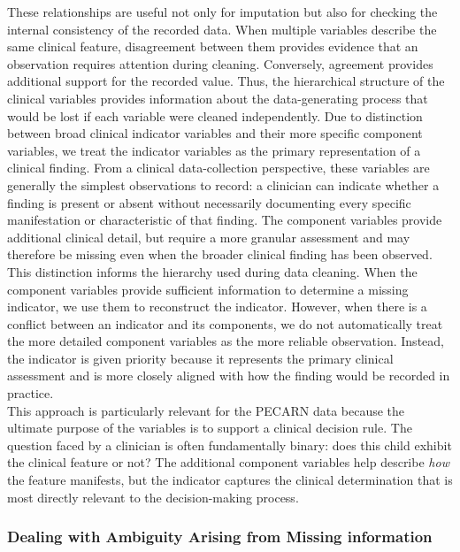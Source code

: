 \documentclass[10pt,letterpaper]{article}
\begin{document}
These relationships are useful not only for imputation but also for checking the internal consistency of the recorded data. When multiple variables describe the same clinical feature, disagreement between them provides evidence that an observation requires attention during cleaning. Conversely, agreement provides additional support for the recorded value. Thus, the hierarchical structure of the clinical variables provides information about the data-generating process that would be lost if each variable were cleaned independently. Due to distinction between broad clinical indicator variables and their more specific component variables, we treat the indicator variables as the primary representation of a clinical finding. From a clinical data-collection perspective, these variables are generally the simplest observations to record: a clinician can indicate whether a finding is present or absent without necessarily documenting every specific manifestation or characteristic of that finding. The component variables provide additional clinical detail, but require a more granular assessment and may therefore be missing even when the broader clinical finding has been observed.\\

This distinction informs the hierarchy used during data cleaning. When the component variables provide sufficient information to determine a missing indicator, we use them to reconstruct the indicator. However, when there is a conflict between an indicator and its components, we do not automatically treat the more detailed component variables as the more reliable observation. Instead, the indicator is given priority because it represents the primary clinical assessment and is more closely aligned with how the finding would be recorded in practice.\\

This approach is particularly relevant for the PECARN data because the ultimate purpose of the variables is to support a clinical decision rule. The question faced by a clinician is often fundamentally binary: does this child exhibit the clinical feature or not? The additional component variables help describe \textit{how} the feature manifests, but the indicator captures the clinical determination that is most directly relevant to the decision-making process.




\subsubsection{Dealing with Ambiguity Arising from Missing information}
\end{document}
